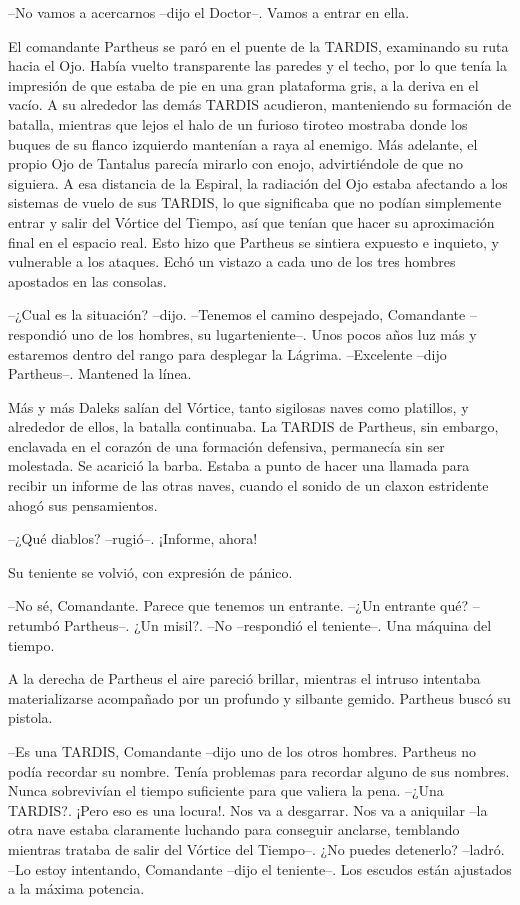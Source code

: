 --No vamos a acercarnos --dijo el Doctor--. Vamos a entrar en ella.

El comandante Partheus se paró en el puente de la TARDIS, examinando su ruta hacia el Ojo. Había vuelto transparente las paredes y el techo, por lo que tenía la impresión de que estaba de pie en una gran plataforma gris, a la deriva en el vacío.
A su alrededor las demás TARDIS acudieron, manteniendo su formación de batalla, mientras que lejos el halo de un furioso tiroteo mostraba donde los buques de su flanco izquierdo mantenían a raya al enemigo. Más adelante, el propio Ojo de Tantalus parecía mirarlo con enojo, advirtiéndole de que no siguiera.
A esa distancia de la Espiral, la radiación del Ojo estaba afectando a los sistemas de vuelo de sus TARDIS, lo que significaba que no podían simplemente entrar y salir del Vórtice del Tiempo, así que tenían que hacer su aproximación final en el espacio real. Esto hizo que Partheus se sintiera expuesto e inquieto, y vulnerable a los ataques.
Echó un vistazo a cada uno de los tres hombres apostados en las consolas. 

--¿Cual es la situación? --dijo.
--Tenemos el camino despejado, Comandante --respondió uno de los hombres, su lugarteniente--. Unos pocos años luz más y estaremos dentro del rango para desplegar la Lágrima.
--Excelente --dijo Partheus--. Mantened la línea.

Más y más Daleks salían del Vórtice, tanto sigilosas naves como platillos, y alrededor de ellos, la batalla continuaba.
La TARDIS de Partheus, sin embargo, enclavada en el corazón de una formación defensiva, permanecía sin ser molestada. Se acarició la barba.
Estaba a punto de hacer una llamada para recibir un informe de las otras naves, cuando el sonido de un claxon estridente ahogó sus pensamientos. 

--¿Qué diablos? --rugió--. ¡Informe, ahora!

Su teniente se volvió, con expresión de pánico. 

--No sé, Comandante. Parece que tenemos un entrante.
--¿Un entrante qué? --retumbó Partheus--. ¿Un misil?.
--No --respondió el teniente--. Una máquina del tiempo.

A la derecha de Partheus el aire pareció brillar, mientras el intruso intentaba materializarse acompañado por un profundo y silbante gemido. Partheus buscó su pistola.

--Es una TARDIS, Comandante --dijo uno de los otros hombres. Partheus no podía recordar su nombre. Tenía problemas para recordar alguno de sus nombres. Nunca sobrevivían el tiempo suficiente para que valiera la pena.
--¿Una TARDIS?. ¡Pero eso es una locura!. Nos va a desgarrar. Nos va a aniquilar --la otra nave estaba claramente luchando para conseguir anclarse, temblando mientras trataba de salir del Vórtice del Tiempo--. ¿No puedes detenerlo? --ladró.
--Lo estoy intentando, Comandante --dijo el teniente--. Los escudos están ajustados a la máxima potencia.


